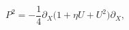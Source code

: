 \begin{equation}
\label{Eq:PP} P^2= -\frac{1}{4}\partial_X \bigl(1+\eta
U+U^2\bigl)\partial_X,
\end{equation}

